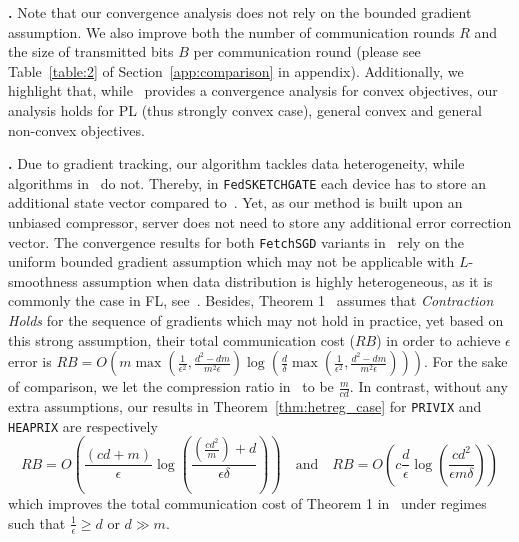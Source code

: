\documentclass[sigconf, anonymous, review]{acmart}
\begin{document}
\noindent\textbf{\citep{li2019privacy}.} Note that our convergence analysis does not rely on the bounded gradient assumption. 
We also improve both the number of communication rounds $R$ and the size of transmitted bits $B$ per communication round (please see Table~\ref{table:2} of Section~\ref{app:comparison} in appendix).  
Additionally, we highlight that, while~\citep{li2019privacy} provides a convergence analysis for convex objectives, our analysis holds for PL (thus strongly convex case), general convex and general non-convex objectives.

\noindent\textbf{\citep{rothchild2020fetchsgd}.}
Due to gradient tracking, our algorithm tackles data heterogeneity, while algorithms in~\citep{rothchild2020fetchsgd} do not. 
Thereby, in \texttt{FedSKETCHGATE} each device has to store an additional state vector compared to~\citep{rothchild2020fetchsgd}. 
Yet, as our method is built upon an unbiased compressor, server does not need to store any additional error correction vector.
The convergence results for both \texttt{FetchSGD} variants in~\citep{rothchild2020fetchsgd} rely on the uniform bounded gradient assumption which may not be applicable with $L$-smoothness assumption when data distribution is highly heterogeneous, as it is commonly the case in FL, see~\citep{bayoumi2020tighter}.
Besides, Theorem 1~\citep{rothchild2020fetchsgd} assumes that \emph{Contraction Holds} for the sequence of gradients which may not hold in practice, yet based on this strong assumption, their total communication cost ($RB$) in order to achieve $\epsilon$ error is $RB=O\left(m\max(\frac{1}{\epsilon^2},\frac{d^2-dm}{m^2\epsilon})\log\left(\frac{d}{\delta}\max(\frac{1}{\epsilon^2},\frac{d^2-dm}{m^2\epsilon})\right)\right)$.
For the sake of comparison, we let the compression ratio in~\citep{rothchild2020fetchsgd} to be $\frac{m}{c d}$. 
In contrast, without any extra assumptions, our results in Theorem~\ref{thm:hetreg_case} for \texttt{PRIVIX} and \texttt{HEAPRIX} are respectively $$RB=O(\frac{(cd+m)}{\epsilon}\log(\frac{{(\frac{cd^2}{m})}+d}{\epsilon\delta})) \quad \textrm{and} \quad RB=O(c\frac{d}{\epsilon}\log(\frac{cd^2}{\epsilon m\delta}))$$ which improves the total communication cost of Theorem 1 in~\citep{rothchild2020fetchsgd} under regimes such that $\frac{1}{\epsilon}\geq d$ or $d\gg m$. 
\end{document}
